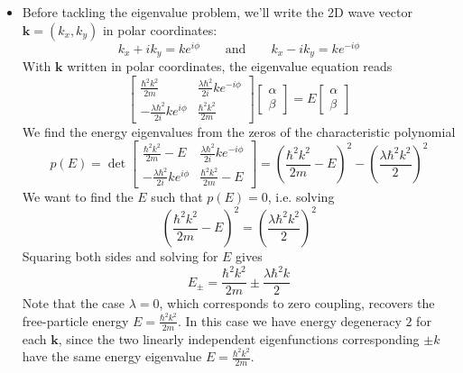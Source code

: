 \documentclass[11pt, a4paper]{article}
\newcommand{\eqtext}[1]{\qquad \text{#1} \qquad}
\renewcommand{\vec}[1]{\bm{#1}} %
\renewcommand{\k}{\vec{k}}  %
\begin{document}
\begin{itemize}
	\item Before tackling the eigenvalue problem, we'll write the 2D wave vector $ \vec{k} = (k_{x}, k_{y}) $ in polar coordinates:
	\begin{equation*}
		k_{x} + ik_{y} = ke^{i\phi} \eqtext{and} k_{x} - ik_{y} = ke^{-i\phi}
	\end{equation*}
	With $ \k $ written in polar coordinates, the eigenvalue equation reads
	\begin{equation*}
		\begin{bmatrix}
		\frac{\hbar^{2}k^{2}}{2m} & \frac{\lambda \hbar^{2}}{2i}ke^{-i\phi} \\[1mm]
		-\frac{\lambda \hbar^{2}}{2i}ke^{i\phi} & \frac{\hbar^{2}k^{2}}{2m}
		\end{bmatrix}
		\begin{bmatrix}
			\alpha\\
			\beta
		\end{bmatrix}
		= E
		\begin{bmatrix}
			\alpha\\
			\beta
		\end{bmatrix}
	\end{equation*}
	We find the energy eigenvalues from the zeros of the characteristic polynomial
	\begin{equation*}
		p(E) = \det 
		\begin{bmatrix}
		\frac{\hbar^{2}k^{2}}{2m} - E & \frac{\lambda \hbar^{2}}{2i}ke^{-i\phi} \\[1mm]
		-\frac{\lambda \hbar^{2}}{2i}ke^{i\phi} & \frac{\hbar^{2}k^{2}}{2m} - E
		\end{bmatrix}
		= \left( \frac{\hbar^{2}k^{2}}{2m} - E\right)^{2} - \left(\frac{\lambda \hbar^{2}k^{2}}{2}\right)^{2} 
	\end{equation*}	
	We want to find the $ E $ such that $ p(E) = 0 $, i.e. solving
	\begin{equation*}
		\left( \frac{\hbar^{2}k^{2}}{2m} - E\right)^{2} = \left(\frac{\lambda \hbar^{2}k^{2}}{2}\right)^{2} 
	\end{equation*}
	Squaring both sides and solving for $ E $ gives
	\begin{equation*}
		E_{\pm} = \frac{\hbar^{2}k^{2}}{2m} \pm \frac{\lambda \hbar^{2}k}{2}
	\end{equation*}
	Note that the case $ \lambda = 0 $, which corresponds to zero coupling, recovers the free-particle energy $ E = \frac{\hbar^{2}k^{2}}{2m} $. In this case we have energy degeneracy $ 2 $ for each $ \k $, since the two linearly independent eigenfunctions corresponding $ \pm k $ have the same energy eigenvalue $ E = \frac{\hbar^{2}k^{2}}{2m} $.
	

\end{itemize}
\end{document}
